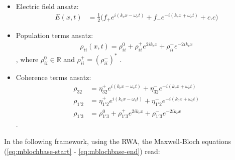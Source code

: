 \documentclass[10pt,english,fleqn]{article}%
\begin{document}
\begin{itemize}
 \item {Electric field ansatz: 
    \begin{align}
	E(x,t) &= \frac{1}{2} \big ( f_{+} e^{i(k_c x-\omega_c t)} + f_{-} e^{-i(k_c x+\omega_c t)} + c.c \big )
    \end{align}}
 \item {Population terms ansatz: 
    \begin{align}
       \rho_{ii}(x,t) = \rho_{ii}^0 + \rho_{ii}^+ e^{2ik_c x} + \rho_{ii}^-e^{-2ik_c x}
    \end{align} , where $\rho_{ii}^0 \in \mathbb{R} $  and  $\rho_{ii}^+ = (\rho_{ii}^-)^*$ .  }
  \item {Coherence terms ansatz:
    \begin{align}
      \rho_{32} &= \eta_{32}^{+}e^{i(k_cx-\omega_ct)} + \eta_{32}^{-}e^{-i(k_c x+\omega_c t)} \nonumber \\
      \rho_{1'2} &= \eta_{1'2}^{+}e^{i(k_c x - \omega_c t)} + \eta_{1'2}^{-}e^{-i(k_c x+\omega_c t)} \nonumber \\
      \rho_{1'3} &= \rho_{1'3}^0 + \rho_{1'3}^{+} e^{2ik_cx} +  \rho_{1'3}^{-} e^{-2ik_cx} 
    \end{align}.
    }
\end{itemize}

In the following framework, using the RWA, the Maxwell-Bloch equations (\ref{eq:mblochbase-start} - \ref{eq:mblochbase-end}) read: 
\end{document}
